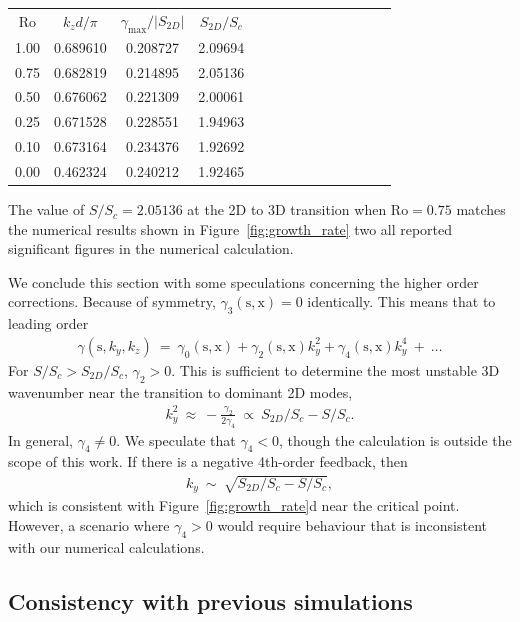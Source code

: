 \documentclass{rsproca_new}%
\newcommand{\SSC}{S/S_{c}}
\newcommand\Beq{\begin{eqnarray}}
\newcommand\Eeq{\end{eqnarray}}
\newcommand{\Ro}{\mathrm{Ro}}
\newcommand{\s}{\text{s}}
\newcommand{\x}{\text{x}}
\begin{document}
\begin{center}
\begin{tabular}{cccccccccccccc}
\textbf{$\Ro$} & \textbf{$k_{z} d/\pi$}  & \textbf{$\gamma_{\max}/|S_{2D}|$}  &  \textbf{$S_{2D}/S_{c}$} \\
                   1.00  & 0.689610 & 0.208727 &   2.09694 \\ 
                   0.75 & 0.682819 & 0.214895 & 2.05136 \\
                   0.50 & 0.676062 & 0.221309 & 2.00061 \\
                   0.25 & 0.671528 & 0.228551 & 1.94963 \\
                   0.10 & 0.673164 & 0.234376 & 1.92692 \\
                   0.00 & 0.462324 & 0.240212 & 1.92465
\end{tabular}
\end{center}
The value of $\SSC = 2.05136$ at the 2D to 3D transition when $\Ro = 0.75$ matches the numerical results shown in Figure~\ref{fig:growth_rate} two all reported significant figures in the numerical calculation. 

We conclude this section with some speculations concerning the higher order corrections. Because of symmetry, $\gamma_{3}(\s,\x) = 0$ identically. This means that to leading order 
\Beq
\gamma(\s,k_{y},k_{z}) \ = \ \gamma_{0}(\s,\x) + \gamma_{2}(\s,\x) k_{y}^{2}  + \gamma_{4}(\s,\x) k_{y}^{4} \ + \ \ldots
\Eeq 
For $\SSC > S_{2D}/S_{c}$, $\gamma_{2} > 0$. This is sufficient to determine the most unstable 3D wavenumber near the transition to dominant 2D modes, 
\Beq
k_{y}^{2} \ \approx \ -\frac{\gamma _2}{2 \gamma_4} \  \propto \   S_{2D}/S_{c} - \SSC   . 
\Eeq 
In general, $\gamma_{4} \ne 0$. We speculate that $\gamma_{4} < 0$, though the calculation is outside the scope of this work. If there is a negative 4th-order feedback, then 
\Beq
k_{y} \ \sim \ \sqrt{S_{2D}/S_{c} - \SSC}, 
\Eeq
which is consistent with Figure~\ref{fig:growth_rate}d near the critical point. However, a scenario where $\gamma_{4} > 0$ would require behaviour that is inconsistent with our numerical calculations.

\subsection{Consistency with previous simulations}
\label{sec:prior_work}
\end{document}
